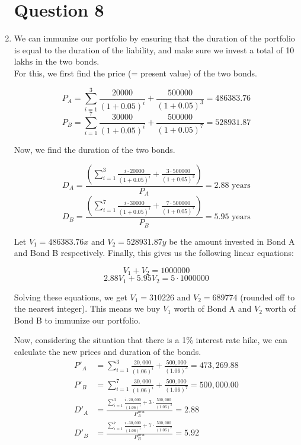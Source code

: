 \documentclass[a4paper]{article}
\begin{document}
\begin{enumerate}
    \vspace*{15mm}
    \section*{Question 8}
    \item We can immunize our portfolio by ensuring that the duration of the portfolio is equal to the duration of the liability, and make sure we invest a total of 10 lakhs in the two bonds. \\
    
    For this, we first find the price (= present value) of the two bonds.

    \[ P_A = \sum_{i=1}^{3} \frac{20000}{(1 + 0.05)^i} + \frac{500000}{(1 + 0.05)^3} = 486383.76 \]
    \[ P_B = \sum_{i=1}^{7} \frac{30000}{(1 + 0.05)^i} + \frac{500000}{(1 + 0.05)^7} = 528931.87 \]

    Now, we find the duration of the two bonds.

    \[ D_A = \frac{\left( \sum_{i=1}^{3} \frac{i \cdot 20000}{(1 + 0.05)^i} + \frac{3 \cdot 500000}{(1 + 0.05)^3} \right)}{P_A} = 2.88 \text{ years} \]
    \[ D_B = \frac{\left( \sum_{i=1}^{7} \frac{i \cdot 30000}{(1 + 0.05)^i} + \frac{7 \cdot 500000}{(1 + 0.05)^7} \right)}{P_B} = 5.95 \text{ years} \]
    
    Let $V_1 = 486383.76x$ and $V_2 = 528931.87y$ be the amount invested in Bond A and Bond B respectively. Finally, this gives us the following linear equations:
    
    \[ V_1 + V_2 = 1000000 \]
    \[ 2.88V_1 + 5.95V_2 = 5 \cdot 1000000 \]


    Solving these equations, we get $V_1 = 310226$ and $V_2 = 689774$ (rounded off to the nearest integer). This means we buy $V_1$ worth of Bond A and $V_2$ worth of Bond B to immunize our portfolio.

    \newpage

    Now, considering the situation that there is a 1\% interest rate hike, we can calculate the new prices and duration of the bonds. \\

    \begin{align*}
        P'_A &= \sum_{i=1}^{3} \frac{20,000}{(1.06)^i} + \frac{500,000}{(1.06)^3} = 473,269.88 \\
        P'_B &= \sum_{i=1}^{7} \frac{30,000}{(1.06)^i} + \frac{500,000}{(1.06)^7} = 500,000.00 \\
        D'_A &= \frac{\sum_{i=1}^{3} \frac{i \cdot 20,000}{(1.06)^i} + 3 \cdot \frac{500,000}{(1.06)^3}}{P_A^{new}} = 2.88 \\
        D'_B &= \frac{\sum_{i=1}^{7} \frac{i \cdot 30,000}{(1.06)^i} + 7 \cdot \frac{500,000}{(1.06)^7}}{P_B^{new}} = 5.92
    \end{align*}


\end{enumerate}
\end{document}
